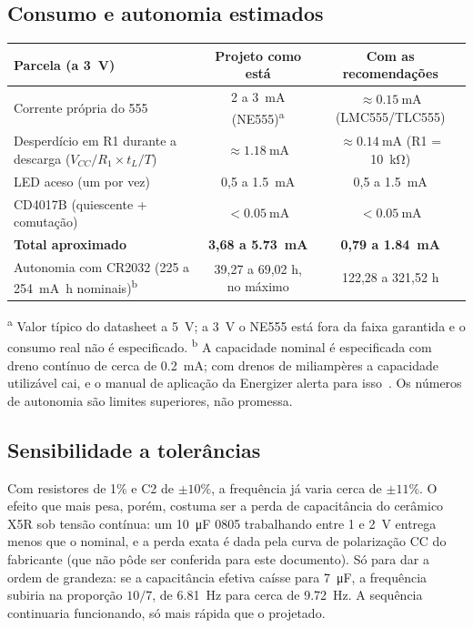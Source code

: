 \documentclass[11pt,a4paper]{article}
\begin{document}
\subsection{Consumo e autonomia estimados}
\begin{center}
\small
\begin{tabularx}{\linewidth}{@{}Y c c@{}}
\toprule
\textbf{Parcela (a \SI{3}{\volt})} & \textbf{Projeto como está} & \textbf{Com as recomendações} \\
\midrule
Corrente própria do 555 & 2 a \SI{3}{\milli\ampere} (NE555)\textsuperscript{a} & $\approx \SI{0,15}{\milli\ampere}$ (LMC555/TLC555) \\
Desperdício em R1 durante a descarga ($V_{CC}/R_1 \times t_L/T$) & $\approx \SI{1,18}{\milli\ampere}$ & $\approx \SI{0,14}{\milli\ampere}$ (R1 = \SI{10}{\kilo\ohm}) \\
LED aceso (um por vez) & 0,5 a \SI{1,5}{\milli\ampere} & 0,5 a \SI{1,5}{\milli\ampere} \\
CD4017B (quiescente + comutação) & $< \SI{0,05}{\milli\ampere}$ & $< \SI{0,05}{\milli\ampere}$ \\
\midrule
\textbf{Total aproximado} & \textbf{3,68 a \SI{5,73}{\milli\ampere}} & \textbf{0,79 a \SI{1,84}{\milli\ampere}} \\
Autonomia com CR2032 (225 a \SI{254}{\milli\ampere\hour} nominais)\textsuperscript{b} & 39,27 a 69,02 h, no máximo & 122,28 a 321,52 h \\
\bottomrule
\end{tabularx}
\end{center}
{\footnotesize \textsuperscript{a} Valor típico do datasheet a \SI{5}{\volt}; a \SI{3}{\volt} o
NE555 está fora da faixa garantida e o consumo real não é especificado.
\textsuperscript{b} A capacidade nominal é especificada com dreno contínuo de cerca de
\SI{0,2}{\milli\ampere}; com drenos de miliampères a capacidade utilizável cai, e o manual
de aplicação da Energizer alerta para isso~\cite{enerman}. Os números de autonomia são
limites superiores, não promessa.}

\subsection{Sensibilidade a tolerâncias}
Com resistores de 1\% e C2 de $\pm10\%$, a frequência já varia cerca de $\pm 11\%$. O
efeito que mais pesa, porém, costuma ser a perda de capacitância do cerâmico X5R sob
tensão contínua: um \SI{10}{\micro\farad} 0805 trabalhando entre 1 e \SI{2}{\volt} entrega
menos que o nominal, e a perda exata é dada pela curva de polarização CC do fabricante
(que não pôde ser conferida para este documento). Só para dar a ordem de grandeza: se a
capacitância efetiva caísse para \SI{7}{\micro\farad}, a frequência subiria na proporção
$10/7$, de \SI{6,81}{\hertz} para cerca de \SI{9,72}{\hertz}. A sequência continuaria funcionando, só
mais rápida que o projetado.
\end{document}
